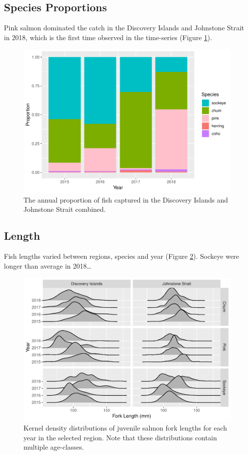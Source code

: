 \documentclass[fleqn,10pt]{wlpeerj} %
\begin{document}
\subsection*{Species Proportions}\label{species-proportions}

Pink salmon dominated the catch in the Discovery Islands and Johnstone
Strait in 2018, which is the first time observed in the time-series
(Figure \ref{fig:prop}).

\begin{figure}
\includegraphics[width=0.8\linewidth]{peer_j_migration_dynamics_files/figure-latex/prop-1} \caption{The annual proportion of fish captured in the Discovery Islands and Johnstone Strait combined.}\label{fig:prop}
\end{figure}

\subsection*{Length}\label{length}

Fish lengths varied between regions, species and year (Figure
\ref{fig:length}). Sockeye were longer than average in 2018\ldots{}

\begin{figure}
\includegraphics[width=0.8\linewidth]{peer_j_migration_dynamics_files/figure-latex/length-1} \caption{Kernel density distributions of juvenile salmon fork lengths for each year in the selected region. Note that these distributions contain multiple age-classes.}\label{fig:length}
\end{figure}
\end{document}
